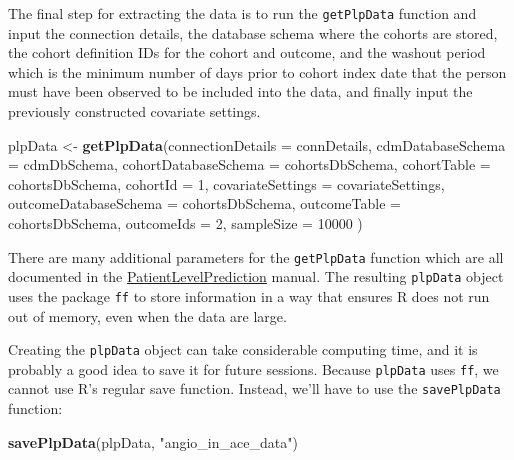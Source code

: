 \documentclass[11pt]{book}
\newenvironment{Shaded}{\begin{snugshade}}{\end{snugshade}}
\newcommand{\KeywordTok}[1]{\textcolor[rgb]{0.13,0.29,0.53}{\textbf{#1}}}
\newcommand{\DataTypeTok}[1]{\textcolor[rgb]{0.13,0.29,0.53}{#1}}
\newcommand{\DecValTok}[1]{\textcolor[rgb]{0.00,0.00,0.81}{#1}}
\newcommand{\StringTok}[1]{\textcolor[rgb]{0.31,0.60,0.02}{#1}}
\newcommand{\NormalTok}[1]{#1}
\theoremstyle{definition}
\theoremstyle{definition}
\theoremstyle{definition}
\theoremstyle{remark}
\begin{document}
The final step for extracting the data is to run the \texttt{getPlpData}
function and input the connection details, the database schema where the
cohorts are stored, the cohort definition IDs for the cohort and
outcome, and the washout period which is the minimum number of days
prior to cohort index date that the person must have been observed to be
included into the data, and finally input the previously constructed
covariate settings.

\begin{Shaded}
\begin{Highlighting}[]
\NormalTok{plpData <-}\StringTok{ }\KeywordTok{getPlpData}\NormalTok{(}\DataTypeTok{connectionDetails =}\NormalTok{ connDetails,}
                      \DataTypeTok{cdmDatabaseSchema =}\NormalTok{ cdmDbSchema,}
                      \DataTypeTok{cohortDatabaseSchema =}\NormalTok{ cohortsDbSchema,}
                      \DataTypeTok{cohortTable =}\NormalTok{ cohortsDbSchema,}
                      \DataTypeTok{cohortId =} \DecValTok{1}\NormalTok{,}
                      \DataTypeTok{covariateSettings =}\NormalTok{ covariateSettings,}
                      \DataTypeTok{outcomeDatabaseSchema =}\NormalTok{ cohortsDbSchema,}
                      \DataTypeTok{outcomeTable =}\NormalTok{ cohortsDbSchema,}
                      \DataTypeTok{outcomeIds =} \DecValTok{2}\NormalTok{,}
                      \DataTypeTok{sampleSize =} \DecValTok{10000}
\NormalTok{)}
\end{Highlighting}
\end{Shaded}

There are many additional parameters for the \texttt{getPlpData}
function which are all documented in the
\href{https://ohdsi.github.io/PatientLevelPrediction/}{PatientLevelPrediction}
manual. The resulting \texttt{plpData} object uses the package
\texttt{ff} to store information in a way that ensures R does not run
out of memory, even when the data are large.

Creating the \texttt{plpData} object can take considerable computing
time, and it is probably a good idea to save it for future sessions.
Because \texttt{plpData} uses \texttt{ff}, we cannot use R's regular
save function. Instead, we'll have to use the \texttt{savePlpData}
function:

\begin{Shaded}
\begin{Highlighting}[]
\KeywordTok{savePlpData}\NormalTok{(plpData, }\StringTok{"angio_in_ace_data"}\NormalTok{)}
\end{Highlighting}
\end{Shaded}
\end{document}
